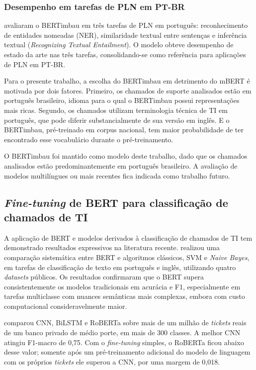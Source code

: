\documentclass[
    12pt,                %
    openright,           %
    oneside,             %
    a4paper,             %
    english,             %
    brazil               %
]{abntex2}
\begin{document}
\subsubsection{Desempenho em tarefas de PLN em PT-BR}
\label{subsubsec:bertimbau_desempenho}

 avaliaram o BERTimbau em três tarefas de PLN em português: reconhecimento de entidades nomeadas (NER), similaridade textual entre sentenças e inferência textual (\textit{Recognizing Textual Entailment}). O modelo obteve desempenho de estado da arte nas três tarefas, consolidando-se como referência para aplicações de PLN em PT-BR.

Para o presente trabalho, a escolha do BERTimbau em detrimento do mBERT é motivada por dois fatores. Primeiro, os chamados de suporte analisados estão em português brasileiro, idioma para o qual o BERTimbau possui representações mais ricas. Segundo, os chamados utilizam terminologia técnica de TI em português, que pode diferir substancialmente de sua versão em inglês. E o BERTimbau, pré-treinado em corpus nacional, tem maior probabilidade de ter encontrado esse vocabulário durante o pré-treinamento.

O BERTimbau foi mantido como modelo deste trabalho, dado que os chamados analisados estão predominantemente em português brasileiro. A avaliação de modelos multilíngues ou mais recentes fica indicada como trabalho futuro.

\subsection{\textit{Fine-tuning} de BERT para classificação de chamados de TI}
\label{subsec:bert_tickets}

A aplicação de BERT e modelos derivados à classificação de chamados de TI tem demonstrado resultados expressivos na literatura recente.  realizou uma comparação sistemática entre BERT e algoritmos clássicos, SVM e \textit{Naive Bayes}, em tarefas de classificação de texto em português e inglês, utilizando quatro \textit{datasets} públicos. Os resultados confirmaram que o BERT supera consistentemente os modelos tradicionais em acurácia e F1, especialmente em tarefas multiclasse com nuances semânticas mais complexas, embora com custo computacional consideravelmente maior.

 comparou CNN, BiLSTM e RoBERTa sobre mais de um 
milhão de \textit{tickets} reais de um banco privado de médio porte, em 
mais de 300 classes. A melhor CNN atingiu F1-macro de 0,75. Com o 
\textit{fine-tuning} simples, o RoBERTa ficou abaixo desse valor; somente 
após um pré-treinamento adicional do modelo de linguagem com os próprios 
\textit{tickets} ele superou a CNN, por uma margem de 0,018.
\end{document}
